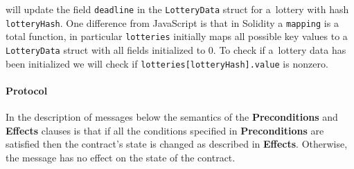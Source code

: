 \documentclass[a4paper]{article}
\begin{document}
    will update the field \texttt{deadline} in the \texttt{LotteryData} struct for a~lottery with hash
    \texttt{lotteryHash}. One difference from JavaScript is that in Solidity a \texttt{mapping} is a total
    function, in particular \texttt{lotteries} initially maps all possible key values to
    a \texttt{LotteryData} struct with all fields initialized to 0. To check if a~lottery data has been initialized
    we will check if \texttt{lotteries[lotteryHash].value} is nonzero.


\paragraph{Protocol}

    In the description of messages below the semantics of the \textbf{Preconditions} and \textbf{Effects} clauses is
    that if all the conditions specified in \textbf{Preconditions} are satisfied then the contract's state is changed
    as described in \textbf{Effects}. Otherwise, the message has no effect on the state of the contract.
\end{document}
